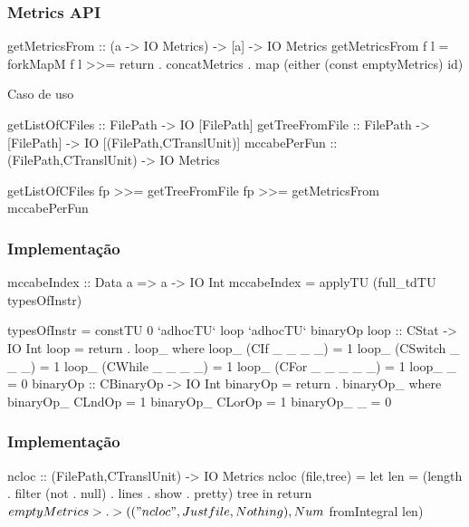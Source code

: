 \documentclass{beamer}
\begin{document}
\begin{frame}[fragile] \frametitle{Metrics API}
\begin{haskellcode}
getMetricsFrom :: (a -> IO Metrics) -> [a] -> IO Metrics
getMetricsFrom f l =
    forkMapM f l >>=
        return . concatMetrics . map (either (const emptyMetrics) id)
\end{haskellcode}
\begin{block}{Caso de uso}
\begin{haskellcode}
getListOfCFiles :: FilePath -> IO [FilePath]
getTreeFromFile :: FilePath -> [FilePath] -> IO [(FilePath,CTranslUnit)]
mccabePerFun :: (FilePath,CTranslUnit) -> IO Metrics

getListOfCFiles fp >>= getTreeFromFile fp >>= getMetricsFrom mccabePerFun
\end{haskellcode}
\end{block}
\end{frame}

\begin{frame}[fragile] \frametitle{Implementação}
\begin{block}{}
\begin{haskellcode}
mccabeIndex :: Data a => a -> IO Int
mccabeIndex = applyTU (full_tdTU typesOfInstr)

typesOfInstr = constTU 0
  `adhocTU` loop
  `adhocTU` binaryOp
loop :: CStat -> IO Int
loop = return . loop_
  where loop_ (CIf _ _ _ _)    = 1
        loop_ (CSwitch _ _ _)  = 1
        loop_ (CWhile _ _ _ _) = 1
        loop_ (CFor _ _ _ _ _) = 1
        loop_ _                = 0
        binaryOp :: CBinaryOp -> IO Int
        binaryOp = return . binaryOp_
          where binaryOp_ CLndOp = 1
                binaryOp_ CLorOp  = 1
                binaryOp_ _      = 0
\end{haskellcode}
\end{block}
\end{frame}

\begin{frame}[fragile] \frametitle{Implementação}
\begin{block}{}
\begin{haskellcode}
ncloc :: (FilePath,CTranslUnit) -> IO Metrics
ncloc (file,tree) =
  let len = (length . filter (not . null) . lines . show . pretty) tree
  in return $ emptyMetrics
       >.> (("ncloc",Just file,Nothing),Num $ fromIntegral len)
\end{haskellcode}
\end{block}
\end{frame}
\end{document}
